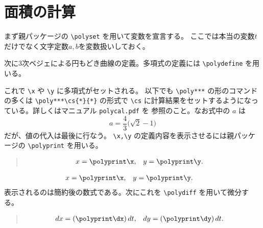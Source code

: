 \documentclass[dvipdfmx]{jsarticle}\usepackage[moga-mobo]{pxchfon}
\begin{document}
\section{面積の計算}
まず親パッケージの \verb|\polyset| を用いて変数を宣言する。
ここでは本当の変数$t$だけでなく文字定数$a,b$を変数扱いしておく。
\begin{quote}
\begin{boxedverbatim}
\end{boxedverbatim}
\end{quote}
次に3次ベジェによる円もどき曲線の定義。多項式の定義には \verb|\polydefine| を用いる。
\polydefine{}
\polydefine{}
\begin{quote}
\begin{boxedverbatim}
\polydefine{}
\polydefine{}
\end{boxedverbatim}
\end{quote}
これで \verb|\x| や \verb|\y| に多項式がセットされる。
以下でも \verb|\poly***| の形のコマンドの多くは  \verb|\poly***\cs{*}{*}| の形式で
\verb|\cs| に計算結果をセットするようになっている。詳しくはマニュアル \verb|polycal.pdf| を
参照のこと。なお式中の $a$ は
\[
  a=\frac43\bigl(\sqrt2-1\bigr)
\]
だが、値の代入は最後に行なう。
\verb+\x,\y+ の定義内容を表示させるには親パッケージの \verb+\polyprint+ を用いる。
\begin{quote}
\begin{boxedverbatim}
\begin{align*}
  x &= \polyprint\x, & y &= \polyprint\y.
\end{align*}    
\end{boxedverbatim}
\end{quote}
\begin{align*}
  x &= \polyprint\x, & y &= \polyprint\y.
\end{align*}
表示されるのは簡約後の数式である。次にこれを \verb|\polydiff| を用いて微分する。
\polydiff{}\x  \polydiff{}\y
\begin{quote}
\begin{boxedverbatim}
\polydiff{}\x  \polydiff{}\y
\begin{align*}
  dx &= (\polyprint\dx)\,dt, & dy &= (\polyprint\dy)\,dt.
\end{align*}    
\end{boxedverbatim}
\end{quote}
\end{document}

